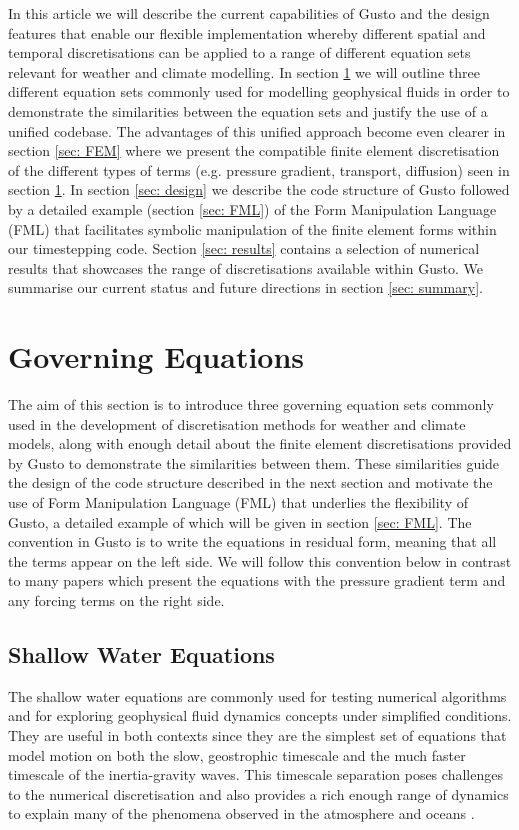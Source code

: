 \documentclass[journal abbreviation, manuscript]{copernicus}
\begin{document}
In this article we will describe the current capabilities of Gusto and
the design features that enable our flexible implementation whereby
different spatial and temporal discretisations can be applied to a
range of different equation sets relevant for weather and climate
modelling. In section \ref{sec: equations} we will outline three
different equation sets commonly used for modelling geophysical fluids
in order to demonstrate the similarities between the equation sets and
justify the use of a unified codebase. The advantages of this unified
approach become even clearer in section \ref{sec: FEM} where we
present the compatible finite element discretisation of the different
types of terms (e.g. pressure gradient, transport, diffusion) seen in
section \ref{sec: equations}. In section \ref{sec: design} we describe
the code structure of Gusto followed by a detailed example (section
\ref{sec: FML}) of the Form Manipulation Language (FML) that
facilitates symbolic manipulation of the finite element forms within
our timestepping code. Section \ref{sec: results} contains a selection
of numerical results that showcases the range of discretisations
available within Gusto. We summarise our current status and future
directions in section \ref{sec: summary}.

\section{Governing Equations}
\label{sec: equations}
The aim of this section is to introduce three governing equation sets
commonly used in the development of discretisation methods for weather
and climate models, along with enough detail about the finite element
discretisations provided by Gusto to demonstrate the similarities
between them. These similarities guide the design of the code
structure described in the next section and motivate the use of Form
Manipulation Language (FML) that underlies the flexibility of Gusto, a
detailed example of which will be given in section \ref{sec: FML}. The
convention in Gusto is to write the equations in residual form,
meaning that all the terms appear on the left side. We will follow
this convention below in contrast to many papers which present the
equations with the pressure gradient term and any forcing terms on the
right side.

\subsection{Shallow Water Equations}
The shallow water equations are commonly used for testing numerical
algorithms and for exploring geophysical fluid dynamics concepts under
simplified conditions. They are useful in both contexts since they are
the simplest set of equations that model motion on both the slow,
geostrophic timescale and the much faster timescale of the
inertia-gravity waves. This timescale separation poses challenges to
the numerical discretisation and also provides a rich enough range of
dynamics to explain many of the phenomena observed in the atmosphere
and oceans \citep{zeitlin2018geophysical}.
\end{document}
